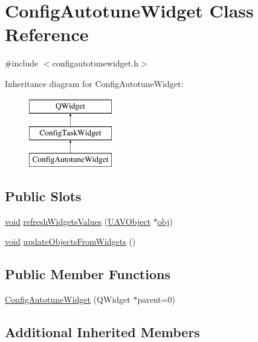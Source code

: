 \hypertarget{class_config_autotune_widget}{\section{Config\-Autotune\-Widget Class Reference}
\label{class_config_autotune_widget}
}


{\ttfamily \#include $<$configautotunewidget.\-h$>$}

Inheritance diagram for Config\-Autotune\-Widget\-:\begin{figure}[H]
\begin{center}
\leavevmode
\includegraphics[height=3.000000cm]{class_config_autotune_widget}
\end{center}
\end{figure}
\subsection*{Public Slots}
\begin{DoxyCompactItemize}
\item 
\hyperlink{group___u_a_v_objects_plugin_ga444cf2ff3f0ecbe028adce838d373f5c}{void} \hyperlink{group___config_plugin_ga7a345485561483fc0d3252acc34f65cd}{refresh\-Widgets\-Values} (\hyperlink{class_u_a_v_object}{U\-A\-V\-Object} $\ast$\hyperlink{glext_8h_a0c0d4701a6c89f4f7f0640715d27ab26}{obj})
\item 
\hyperlink{group___u_a_v_objects_plugin_ga444cf2ff3f0ecbe028adce838d373f5c}{void} \hyperlink{group___config_plugin_ga20c0a1a9487c7f461a6ea095fac93098}{update\-Objects\-From\-Widgets} ()
\end{DoxyCompactItemize}
\subsection*{Public Member Functions}
\begin{DoxyCompactItemize}
\item 
\hyperlink{group___config_plugin_ga989f53fb20055f01ad3e2b5b08a6103f}{Config\-Autotune\-Widget} (Q\-Widget $\ast$parent=0)
\end{DoxyCompactItemize}
\subsection*{Additional Inherited Members}


